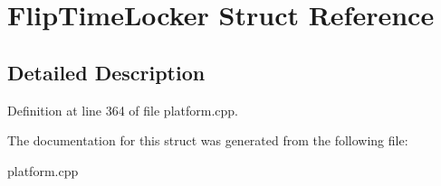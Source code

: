 \hypertarget{structFlipTimeLocker}{\section{Flip\+Time\+Locker Struct Reference}
\label{structFlipTimeLocker}
}


\subsection{Detailed Description}


Definition at line 364 of file platform.\+cpp.



The documentation for this struct was generated from the following file\+:\begin{DoxyCompactItemize}
\item 
platform.\+cpp\end{DoxyCompactItemize}
